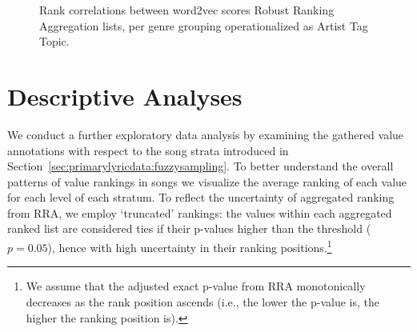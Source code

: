 \documentclass{article}
\begin{document}
\begin{figure}
 \centerline{}
 \caption{Rank correlations between word2vec scores Robust Ranking Aggregation lists, per genre grouping operationalized as Artist Tag Topic.}
 \label{fig:artist_tag_topic}
\end{figure}


\section{Descriptive Analyses}

We conduct a further exploratory data analysis by examining the gathered value annotations with respect to the song strata introduced in Section~\ref{sec:primarylyricdata:fuzzysampling}. To better understand the overall patterns of value rankings in songs we visualize the average ranking of each value for each level of each stratum. To reflect the uncertainty of aggregated ranking from RRA, we employ `truncated' rankings: the values within each aggregated ranked list are considered ties if their p-values higher than the threshold ($p=0.05$), hence with high uncertainty in their ranking positions.\footnote{We assume that the adjusted exact p-value from RRA monotonically decreases as the rank position ascends (i.e., the lower the p-value is, the higher the ranking position is).}

\end{document}
